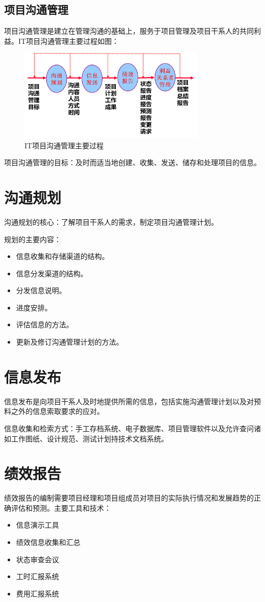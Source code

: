 \subsection{项目沟通管理}
项目沟通管理是建立在管理沟通的基础上，服务于项目管理及项目干系人的共同利益。IT项目沟通管理主要过程如图：
\begin{figure}[!h]
	\centering
	\includegraphics[width=0.8\textwidth]{image/9-4}
	\caption{IT项目沟通管理主要过程}
\end{figure}
\par 项目沟通管理的目标：及时而适当地创建、收集、发送、储存和处理项目的信息。
\section{沟通规划}
沟通规划的核心：了解项目干系人的需求，制定项目沟通管理计划。
\par 规划的主要内容：
\begin{itemize}
	\item 信息收集和存储渠道的结构。
	\item 信息分发渠道的结构。
	\item 分发信息说明。
	\item 进度安排。
	\item 评估信息的方法。
	\item 更新及修订沟通管理计划的方法。
\end{itemize}
\section{信息发布}
信息发布是向项目干系人及时地提供所需的信息，包括实施沟通管理计划以及对预料之外的信息索取要求的应对。
\par 信息收集和检索方式：手工存档系统、电子数据库、项目管理软件以及允许查问诸如工作图纸、设计规范、测试计划持技术文档系统。
\section{绩效报告}
绩效报告的编制需要项目经理和项目组成员对项目的实际执行情况和发展趋势的正确评估和预测。主要工具和技术：
\begin{itemize}
	\item 信息演示工具 
	\item 绩效信息收集和汇总
	\item 状态审查会议 
	\item 工时汇报系统 
	\item 费用汇报系统
\end{itemize}
